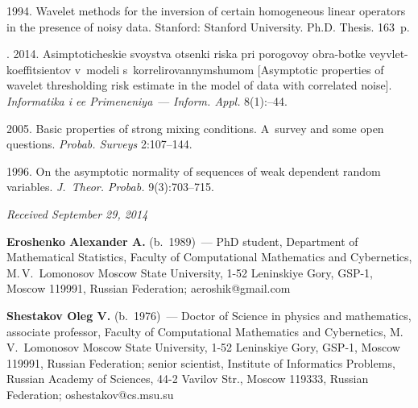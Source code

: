 \begin{multicols}{2}
{{\begin{thebibliography}{9}
 1994. Wavelet
methods for the inversion of certain homogeneous linear operators in
the presence of noisy data.  Stanford: Stanford University. Ph.D. Thesis. 163~p.

\smallskip

. 2014.
Asimptoticheskie svoystva otsenki riska pri porogovoy obra-\linebreak botke
veyvlet-koeffitsientov v~modeli s~korrelirovannym\linebreak shumom
[Asymptotic properties of wavelet thresholding risk estimate in
the model of data with correlated noise].
\textit{Informatika i ee Primeneniya}~--- \textit{Inform. Appl.} 8(1):--44.

\smallskip

 2005.
Basic properties of strong mixing conditions.
A~survey and some open questions. \textit{Probab. Surveys}  2:107--144.

\smallskip

 1996.
On the asymptotic normality of sequences of weak dependent random variables.
\textit{J.~Theor. Probab.} 9(3):703--715.
\end{thebibliography}

 }
 }

\end{multicols}

\vspace*{-6pt}

\hfill{\small\textit{Received September 29, 2014}}

\vspace*{-18pt}

\Contr

\noindent
\textbf{Eroshenko Alexander A.} (b.\ 1989)~---
PhD student, Department of Mathematical Statistics,
Faculty of Computational Mathematics and Cybernetics,
M.\,V.~Lomonosov Moscow State University,
1-52  Leninskiye Gory, GSP-1, Moscow 119991, Russian Federation;
aeroshik@gmail.com

\vspace*{3pt}

\noindent
\textbf{Shestakov Oleg V.} (b.\ 1976)~---
Doctor of Science in physics and mathematics, associate professor,
Faculty of Computational Mathematics and Cybernetics,
M.\,V.~Lomonosov Moscow State University,
1-52  Leninskiye Gory, GSP-1, Moscow 119991, Russian Federation;
senior scientist, Institute of Informatics Problems, Russian Academy of Sciences,
44-2 Vavilov Str., Moscow 119333, Russian Federation;
oshestakov@cs.msu.su

\label{end\stat}

\renewcommand{\bibname}{\protect\rm Литература}